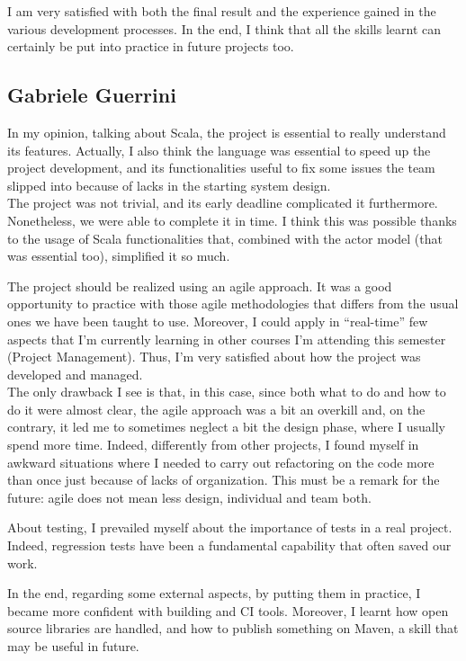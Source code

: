  I am very satisfied with both the final result and the experience gained in the various development processes. In the end, I think that all the skills learnt can certainly be put into practice in future projects too.


\subsection{Gabriele Guerrini}
In my opinion, talking about Scala, the project is essential to really understand its features. Actually, I also think the language was essential to speed up the project development, and its functionalities useful to fix some issues the team slipped into because of lacks in the starting system design.
\\
The project was not trivial, and its early deadline complicated it furthermore. Nonetheless, we were able to complete it in time. I think this was possible thanks to the usage of Scala functionalities that, combined with the actor model (that was essential too), simplified it so much.

\bigskip
The project should be realized using an agile approach. It was a good opportunity to practice with those agile methodologies that differs from the usual ones we have been taught to use.
Moreover, I could apply in ``real-time'' few aspects that I'm currently learning in other courses I'm attending this semester (Project Management).
Thus, I'm very satisfied about how the project was developed and managed.
\\
The only drawback I see is that, in this case, since both what to do and how to do it were almost clear, the agile approach was a bit an overkill and, on the contrary, it led me to sometimes neglect a bit the design phase, where I usually spend more time. Indeed, differently from other projects, I found myself in awkward situations where I needed to carry out refactoring on the code more than once just because of lacks of organization. This must be a remark for the future: agile does not mean less design, individual and team both.

\bigskip
About testing, I prevailed myself about the importance of tests in a real project. Indeed, regression tests have been a fundamental capability that often saved our work.

\bigskip
In the end, regarding some external aspects, by putting them in practice, I became more confident with building and CI tools. Moreover, I learnt how open source libraries are handled, and how to publish something on Maven, a skill that may be useful in future.










